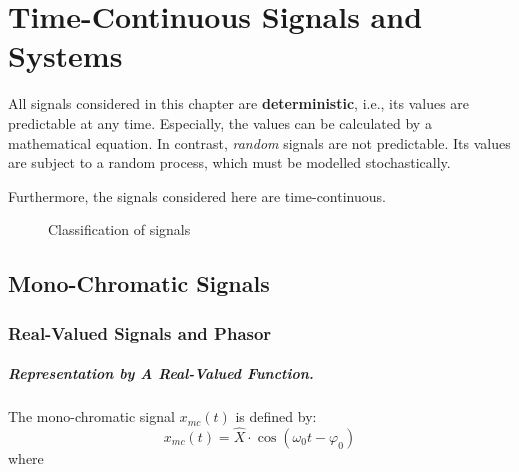 \chapter{Time-Continuous Signals and Systems}

\begin{refsection}

All signals considered in this chapter are  \textbf{deterministic}, i.e., its values are predictable at any time. Especially, the values can be calculated by a mathematical equation. In contrast, \emph{random} signals are not predictable. Its values are subject to a random process, which must be modelled stochastically.

Furthermore, the signals considered here are time-continuous.

\begin{figure}[H]
	\centering
	\caption{Classification of signals}
	\label{fig:ch02:timecont_signals_classif}
\end{figure}

\section{Mono-Chromatic Signals}

\subsection{Real-Valued Signals and Phasor}

\paragraph{Representation by A Real-Valued Function.}

The mono-chromatic signal $x_{mc}(t)$ is defined by:
\begin{equation}
	x_{mc}(t) = \hat{X} \cdot \cos\left(\omega_0 t - \varphi_0\right)
	\label{eq:ch02:mono_chrom_eq}
\end{equation}%
%
where


\end{refsection}

